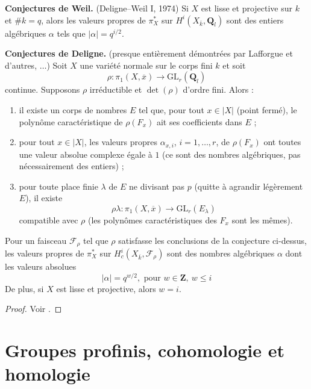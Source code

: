 \noindent
{\bf Conjectures de Weil.} (Deligne--Weil I, 1974) Si $X$ est lisse et projective sur $k$ et
$\# k = q$, alors les valeurs propres de $\pi_X^*$ sur $H^i(X_{\overline{k}},
\mathbf{Q}_l)$ sont des entiers algébriques $\alpha$ tels que $|\alpha|=q^{i/2}$.

\medskip\noindent
{\bf Conjectures de Deligne.} (presque entièrement démontrées par
Lafforgue et d'autres, $\ldots$) Soit $X$ une variété normale sur le corps fini $k$ et soit
$$
\rho : \pi_1(X, \overline{x}) \longrightarrow \text{GL}_r(\mathbf{Q}_l)
$$
continue. Supposons $\rho$ irréductible et $\det(\rho)$ d'ordre fini. Alors :
\begin{enumerate}
\item il existe un corps de nombres $E$ tel que, pour tout $x\in
|X|$ (point fermé), le polynôme caractéristique de $\rho(F_x)$ ait ses coefficients dans $E$ ;
\item pour tout $x\in |X|$, les valeurs propres $\alpha_{x, i}$, $i = 1, \ldots,
r$, de $\rho(F_x)$ ont toutes une valeur absolue complexe égale à $1$
(ce sont des nombres algébriques, pas nécessairement des entiers) ;
\item pour toute place finie $\lambda$ de $E$ ne divisant pas $p$
(quitte à agrandir légèrement $E$), il existe
$$
\rho\lambda : \pi_1(X, \overline{x}) \to \text{GL}_r(E_\lambda)
$$
compatible avec $\rho$ (les polynômes caractéristiques des $F_x$ sont les mêmes).
\end{enumerate}

\begin{theorem}
\label{theorem-weil-II}
Pour un faisceau
$\mathcal{F}_\rho$ tel que $\rho$ satisfasse les conclusions de la conjecture
ci-dessus, les valeurs propres de $\pi_X^*$ sur $H_c^i(X_{\overline{k}},
\mathcal{F}_{\rho})$ sont des nombres algébriques $\alpha$ dont les valeurs absolues
$$
|\alpha|=q^{w/2}, \text{ pour }w\in \mathbf{Z},\ w\leq i
$$
De plus, si $X$ est lisse et projective, alors $w = i$.
\end{theorem}

\begin{proof}
Voir \cite{WeilII}.
\end{proof}




\section{Groupes profinis, cohomologie et homologie}
\label{section-profinite-cohomology}

